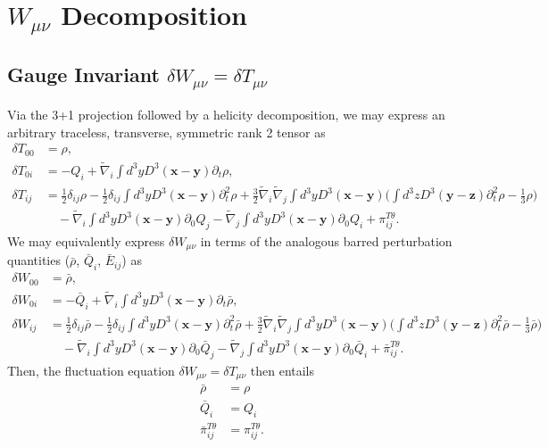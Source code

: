 \documentclass[10pt,letterpaper]{article}
\numberwithin{equation}{subsection}
\begin{document}
\section{$W_{\mu\nu}$ Decomposition}
\subsection{Gauge Invariant $\delta W_{\mu\nu} = \delta T_{\mu\nu}$}
Via the 3+1 projection followed by a helicity decomposition, we may express an arbitrary traceless, transverse, symmetric rank 2 tensor as
\begin{align}
\delta T_{00}  &= \rho,
\nonumber\\	
\delta T_{0i} &= -Q_i  + \tilde\nabla_i  \int d^3y D^3(\mathbf x-\mathbf y) \partial_t  \rho,
\nonumber\\	
\delta T_{ij}  &= 
\frac12 \delta_{ij} \rho - \frac12 \delta_{ij} \int d^3y D^3(\mathbf x-\mathbf y) \partial_t^2 \rho +\frac32 \tilde\nabla_i\tilde\nabla_j \int d^3y D^3(\mathbf x-\mathbf y) \bigg( \int d^3z D^3(\mathbf y-\mathbf z) \partial_t^2 \rho - \frac13\rho\bigg) 
\nonumber\\
&\quad -\tilde\nabla_i \int d^3y D^3(\mathbf x - \mathbf y) \partial_0 Q_j - \tilde\nabla_j \int d^3y D^3(\mathbf x - \mathbf y) \partial_0 Q_i + \pi_{ij}^{T\theta}.
\end{align}
We may equivalently express $\delta W_{\mu\nu}$ in terms of the analogous barred perturbation quantities ($\bar \rho$, $\bar Q_i$, $\bar E_{ij}$) as
\begin{align}
\delta W_{00}  &= \bar\rho,
\nonumber\\	
\delta W_{0i} &= -\bar Q_i  + \tilde\nabla_i  \int d^3y D^3(\mathbf x-\mathbf y) \partial_t  \bar\rho,
\nonumber\\	
\delta W_{ij}  &= 
\frac12 \delta_{ij} \bar\rho - \frac12 \delta_{ij} \int d^3y D^3(\mathbf x-\mathbf y) \partial_t^2 \bar\rho +\frac32 \tilde\nabla_i\tilde\nabla_j \int d^3y D^3(\mathbf x-\mathbf y) \bigg( \int d^3z D^3(\mathbf y-\mathbf z) \partial_t^2 \bar\rho - \frac13\bar\rho\bigg) 
\nonumber\\
&\quad -\tilde\nabla_i \int d^3y D^3(\mathbf x - \mathbf y) \partial_0  \bar Q_j - \tilde\nabla_j \int d^3y D^3(\mathbf x - \mathbf y) \partial_0 \bar Q_i + \bar \pi_{ij}^{T\theta}.
\end{align}
Then, the fluctuation equation $\delta W_{\mu\nu} = \delta T_{\mu\nu}$ then entails
\begin{align}
\bar \rho &= \rho
\nonumber\\
\bar Q_i &= Q_i
\nonumber\\
\bar \pi_{ij}^{T\theta} &= \pi_{ij}^{T\theta}.
\end{align}
\end{document}
